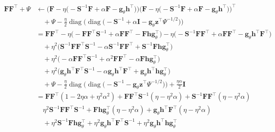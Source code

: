 \documentclass[msc,deptreport.inf]{infthesis} %
\newcommand{\matr}[1]{\mathbf{#1}}
\newcommand{\diag}{\mathop{\mathrm{diag}}}
\begin{document}
\begin{align}
\begin{split}
	\matr{F}\matr{F}^\intercal + \Psi
	& \leftarrow \Big(\matr{F} - \eta\big(-\matr{S}^{-1} \matr{F} + \alpha\matr{F} - \matr{g}_\theta \matr{h}^\intercal \big)\Big)
	\Big(\matr{F} - \eta\big(-\matr{S}^{-1} \matr{F} + \alpha\matr{F} - \matr{g}_\theta \matr{h}^\intercal \big)\Big)^\intercal \\
	& \quad + \Psi - \frac{\eta}{2}\diag\Big(\diag\big( -\matr{S}^{-1} + \alpha\matr{I} -\matr{g}_\theta \matr{z}^\intercal \Psi^{-1/2}  \big) \Big) \\
	& = \matr{F}\matr{F}^\intercal 
	- \eta\big(-\matr{F}\matr{F}^\intercal \matr{S}^{-1} + \alpha \matr{F}\matr{F}^\intercal - \matr{F} \matr{h} \matr{g}_\theta^\intercal \big)
	- \eta\big(-\matr{S}^{-1}\matr{F}\matr{F}^\intercal + \alpha \matr{F}\matr{F}^\intercal - \matr{g}_\theta \matr{h}^\intercal \matr{F}^\intercal \big) \\
	& \quad + \eta^2\big(\matr{S}^{-1}\matr{F}\matr{F}^\intercal \matr{S}^{-1} - \alpha \matr{S}^{-1}\matr{F}\matr{F}^\intercal + \matr{S}^{-1}\matr{F} \matr{h} \matr{g}_\theta^\intercal \big) \\
	& \quad + \eta^2\big( -\alpha\matr{F}\matr{F}^\intercal \matr{S}^{-1} + \alpha^2 \matr{F}\matr{F}^\intercal - \alpha\matr{F} \matr{h} \matr{g}_\theta^\intercal \big) \\
	& \quad + \eta^2\big( \matr{g}_\theta \matr{h}^\intercal \matr{F}^\intercal \matr{S}^{-1} - \alpha \matr{g}_\theta \matr{h}^\intercal \matr{F}^\intercal + \matr{g}_\theta \matr{h}^\intercal \matr{h} \matr{g}_\theta^\intercal \big) \\
	& \quad + \Psi - \frac{\eta}{2}\diag\Big(\diag\big( -\matr{S}^{-1} -\matr{g}_\theta \matr{z}^\intercal \Psi^{-1/2}  \big) \Big) + \frac{\eta \alpha}{2} \matr{I} \\
	& =  \matr{F}\matr{F}^\intercal (1 -2\eta\alpha +\eta^2\alpha^2)
	+ \matr{F}\matr{F}^\intercal \matr{S}^{-1} (\eta -\eta^2\alpha)
	+ \matr{S}^{-1}\matr{F}\matr{F}^\intercal (\eta - \eta^2\alpha) \\
	& \quad \eta^2 \matr{S}^{-1}\matr{F}\matr{F}^\intercal \matr{S}^{-1}
	+ \matr{F} \matr{h} \matr{g}_\theta^\intercal(\eta -\eta^2 \alpha) 
	+ \matr{g}_\theta \matr{h}^\intercal \matr{F}^\intercal(\eta -\eta^2 \alpha) \\
	& \quad + \eta^2 \matr{S}^{-1}\matr{F} \matr{h} \matr{g}_\theta^\intercal 
	+ \eta^2 \matr{g}_\theta \matr{h}^\intercal \matr{F}^\intercal \matr{S}^{-1}
	+ \eta^2 \matr{g}_\theta \matr{h}^\intercal \matr{h} \matr{g}_\theta^\intercal \\

\end{split}
\end{align}
\end{document}

